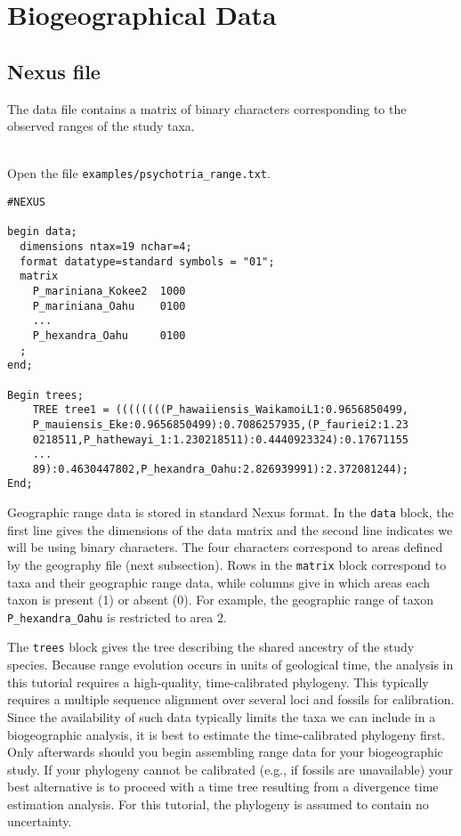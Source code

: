 \section{Biogeographical Data}

\subsection{Nexus file}

The data file contains a matrix of binary characters corresponding to the observed ranges of the study taxa.

\noindent \\ \impmark  Open the file \texttt{examples/psychotria\_range.txt}.

\begin{framed}
\begin{lstlisting}
#NEXUS

begin data;
  dimensions ntax=19 nchar=4;
  format datatype=standard symbols = "01";
  matrix
    P_mariniana_Kokee2  1000
    P_mariniana_Oahu    0100
    ...
    P_hexandra_Oahu     0100
  ;
end;

Begin trees;
	TREE tree1 = ((((((((P_hawaiiensis_WaikamoiL1:0.9656850499,
	P_mauiensis_Eke:0.9656850499):0.7086257935,(P_fauriei2:1.23
	0218511,P_hathewayi_1:1.230218511):0.4440923324):0.17671155
	...
	89):0.4630447802,P_hexandra_Oahu:2.826939991):2.372081244);
End;
\end{lstlisting}
\end{framed}

Geographic range data is stored in standard Nexus format.
In the {\tt data} block, the first line gives the dimensions of the data matrix and the second line indicates we will be using binary characters.
The four characters correspond to areas defined by the geography file (next subsection).
Rows in the {\tt matrix} block correspond to taxa and their geographic range data, while columns give in which areas each taxon is present (1) or absent (0).
For example, the geographic range of taxon {\tt P\_hexandra\_Oahu} is restricted to area 2.

The {\tt trees} block gives the tree describing the shared ancestry of the study species.
Because range evolution occurs in units of geological time, the analysis in this tutorial requires a high-quality, time-calibrated phylogeny.
This typically requires a multiple sequence alignment over several loci and fossils for calibration.
Since the availability of such data typically limits the taxa we can include in a biogeographic analysis, it is best to estimate the time-calibrated phylogeny first.
Only afterwards should you begin assembling range data for your biogeographic study.
If your phylogeny cannot be calibrated (e.g., if fossils are unavailable) your best alternative is to proceed with a time tree resulting from a divergence time estimation analysis.
For this tutorial, the phylogeny is assumed to contain no uncertainty.

